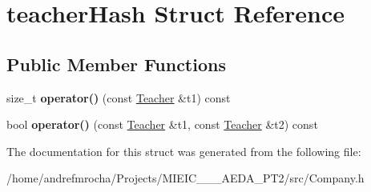 \hypertarget{structteacher_hash}{}\section{teacher\+Hash Struct Reference}
\label{structteacher_hash}
\subsection*{Public Member Functions}
\begin{DoxyCompactItemize}
\item 
\mbox{\label{structteacher_hash_a1bc296c9246758128b5b0ef790c17f9a}} 
size\+\_\+t {\bfseries operator()} (const \mbox{\hyperlink{class_teacher}{Teacher}} \&t1) const
\item 
\mbox{\label{structteacher_hash_ab1d101833f405ffcbe90bc6aa81fe36f}} 
bool {\bfseries operator()} (const \mbox{\hyperlink{class_teacher}{Teacher}} \&t1, const \mbox{\hyperlink{class_teacher}{Teacher}} \&t2) const
\end{DoxyCompactItemize}


The documentation for this struct was generated from the following file\+:\begin{DoxyCompactItemize}
\item 
/home/andrefmrocha/\+Projects/\+M\+I\+E\+I\+C\+\_\+\_\+\_\+\+A\+E\+D\+A\+\_\+\+P\+T2/src/Company.\+h\end{DoxyCompactItemize}
